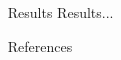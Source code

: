 \documentclass[final,hyperref={pdfpagelabels=false}]{beamer}
\begin{document}
\begin{frame}[t]
\begin{columns}[t]

  \begin{column}{.02\textwidth}\end{column} %

  \begin{column}{.3\textwidth} %

    \begin{block}{Results}
      Results...
    \end{block}

    \begin{block}{References}
      \nocite{*} %
      \linespread{0.928}\selectfont
      \footnotesize{
      }
    \end{block}

  \end{column} %

  \begin{column}{.02\textwidth}\end{column} %

\end{columns} %

\end{frame} %
\end{document}
